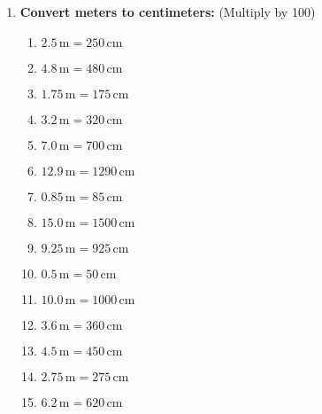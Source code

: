 \documentclass[12pt]{article}
\begin{document}
\begin{enumerate}
    \item \textbf{Convert meters to centimeters:}
    (Multiply by 100)
    \begin{multicols}{2}
    \begin{enumerate}
        \item \(2.5 \, \text{m} = 250 \, \text{cm}\)
        \item \(4.8 \, \text{m} = 480 \, \text{cm}\)
        \item \(1.75 \, \text{m} = 175 \, \text{cm}\)
        \item \(3.2 \, \text{m} = 320 \, \text{cm}\)
        \item \(7.0 \, \text{m} = 700 \, \text{cm}\)
        \item \(12.9 \, \text{m} = 1290 \, \text{cm}\)
        \item \(0.85 \, \text{m} = 85 \, \text{cm}\)
        \item \(15.0 \, \text{m} = 1500 \, \text{cm}\)
        \item \(9.25 \, \text{m} = 925 \, \text{cm}\)
        \item \(0.5 \, \text{m} = 50 \, \text{cm}\)
        \item \(10.0 \, \text{m} = 1000 \, \text{cm}\)
        \item \(3.6 \, \text{m} = 360 \, \text{cm}\)
        \item \(4.5 \, \text{m} = 450 \, \text{cm}\)
        \item \(2.75 \, \text{m} = 275 \, \text{cm}\)
        \item \(6.2 \, \text{m} = 620 \, \text{cm}\)
    \end{enumerate}
    \end{multicols}


\end{enumerate}
\end{document}
